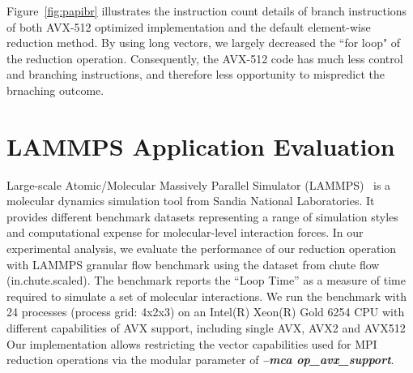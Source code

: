 \documentclass[5p,times,twocolumn]{elsarticle}
\begin{document}
Figure~\ref{fig:papibr} illustrates the instruction count details
of branch instructions of both AVX-512 optimized implementation and the default
element-wise reduction method. By using long vectors, we largely decreased the ``for loop" of the reduction
operation. Consequently, the AVX-512 code has much less control and branching instructions, and therefore less opportunity to mispredict the brnaching outcome.


\section{LAMMPS Application Evaluation}\label{sec:hpcapplication}
Large-scale Atomic/Molecular Massively Parallel Simulator (LAMMPS)~\cite{PLIMPTON19951} is a
molecular dynamics simulation tool from Sandia National Laboratories.
It provides different benchmark datasets representing a range of simulation styles
and computational expense for molecular-level interaction forces.
In our experimental analysis, we evaluate the performance of our reduction
operation with LAMMPS granular flow benchmark
using the dataset from chute flow (in.chute.scaled).
The benchmark reports the “Loop Time” as a measure of
time required to simulate a set of molecular interactions.
We run the benchmark with 24 processes (process
grid: 4x2x3) on an Intel(R) Xeon(R) Gold 6254 CPU with different
capabilities of AVX support, including single AVX, AVX2 and AVX512
Our implementation allows restricting the vector capabilities used for MPI reduction operations via the modular parameter of \emph{\textbf{\textit{--mca op_avx_support}}}.
\end{document}
